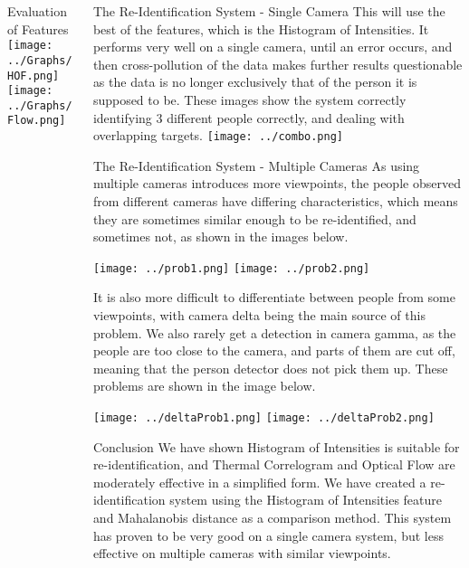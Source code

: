 \documentclass[final]{beamer}
\begin{document}
\begin{frame}{}
\begin{columns}[t]
\begin{column}{.49\linewidth}
\begin{block}{Evaluation of Features}
		\hspace{1cm}
		\texttt{[image: ../Graphs/HOF.png]}
		\hspace{2cm}
		\texttt{[image: ../Graphs/Flow.png]}
		
        \end{block}
	 \end{column}
	 \begin{column}{.49\linewidth}
 		\begin{block}{The Re-Identification System - Single Camera}
 		This will use the best of the features, which is the Histogram of Intensities. It performs very well on a single camera, until an error occurs, and then cross-pollution of the data makes further results questionable as the data is no longer exclusively that of the person it is supposed to be. 
 		These images show the system correctly identifying 3 different people correctly, and dealing with overlapping targets. 
 		\texttt{[image: ../combo.png]}  
         
        \end{block}
        
        \begin{block}{The Re-Identification System - Multiple Cameras}
        As using multiple cameras introduces more viewpoints, the people observed from different cameras have differing characteristics, which means they are sometimes similar enough to be re-identified, and sometimes not, as shown in the images below. 	
        	 
 		\texttt{[image: ../prob1.png]}  
 		\hspace{.7cm}
        \texttt{[image: ../prob2.png]}  
        
         It is also more difficult to differentiate between people from some viewpoints, with camera delta being the main source of this problem. We also rarely get a detection in camera gamma, as the people are too close to the camera, and parts of them are cut off, meaning that the person detector does not pick them up. These problems are shown in the image below.
        
        \texttt{[image: ../deltaProb1.png]}
        \hspace{.7cm}
        \texttt{[image: ../deltaProb2.png]}  
        \end{block}
        
        \begin{block}{Conclusion}
         We have shown Histogram of Intensities is suitable for re-identification, and Thermal Correlogram and Optical Flow are moderately effective in a simplified form. We have created a re-identification system using the Histogram of Intensities feature and Mahalanobis distance as a comparison method. This system has proven to be very good on a single camera system, but less effective on multiple cameras with similar viewpoints.
        

\end{block}
\end{column}
\end{columns}
\end{frame}
\end{document}

